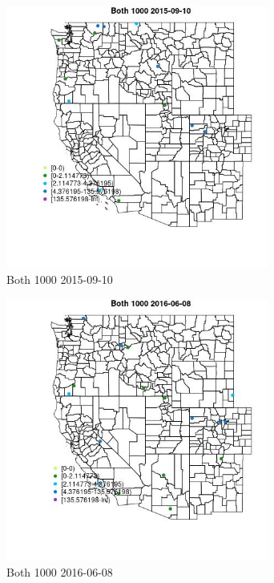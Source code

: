 \begin{figure} 
\centering  
\includegraphics[width=0.77\textwidth]{Code_Outputs/Report_ML_input_PM25_Step4_part_e_de_duplicated_aves_MapObsBoth_10002015-09-10.jpg} 
\caption{\label{fig:Report_ML_input_PM25_Step4_part_e_de_duplicated_avesMapObsBoth_10002015-09-10}Both 1000 2015-09-10} 
\end{figure} 
 

\begin{figure} 
\centering  
\includegraphics[width=0.77\textwidth]{Code_Outputs/Report_ML_input_PM25_Step4_part_e_de_duplicated_aves_MapObsBoth_10002016-06-08.jpg} 
\caption{\label{fig:Report_ML_input_PM25_Step4_part_e_de_duplicated_avesMapObsBoth_10002016-06-08}Both 1000 2016-06-08} 
\end{figure} 
 

